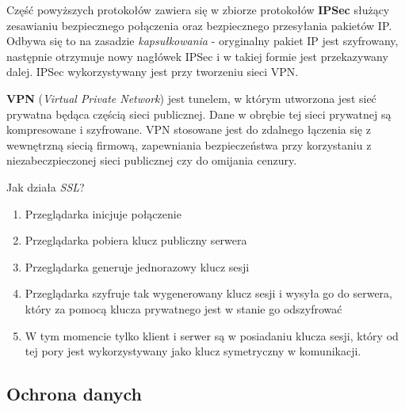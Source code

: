 Część powyższych protokołów zawiera się w zbiorze protokołów \textbf{IPSec} służący zesawianiu bezpiecznego połączenia oraz bezpiecznego przesyłania pakietów IP. Odbywa się to na zasadzie \textit{kapsułkowania} - oryginalny pakiet IP jest szyfrowany, następnie otrzymuje nowy nagłówek IPSec i w takiej formie jest przekazywany dalej. IPSec wykorzystywany jest przy tworzeniu sieci VPN.

\textbf{VPN} (\textit{Virtual Private Network}) jest tunelem, w którym utworzona jest sieć prywatna będąca częścią sieci publicznej. Dane w obrębie tej sieci prywatnej są kompresowane i szyfrowane. VPN stosowane jest do zdalnego łączenia się z wewnętrzną siecią firmową, zapewniania bezpieczeństwa przy korzystaniu z niezabeczpieczonej sieci publicznej czy do omijania cenzury.

Jak działa \textit{SSL}?
\begin{enumerate}
	\item Przeglądarka inicjuje połączenie
	\item Przeglądarka pobiera klucz publiczny serwera
	\item Przeglądarka generuje jednorazowy klucz sesji
	\item Przeglądarka szyfruje tak wygenerowany klucz sesji i wysyła go do serwera, który za pomocą klucza prywatnego jest w stanie go odszyfrować
	\item W tym momencie tylko klient i serwer są w posiadaniu klucza sesji, który od tej pory jest wykorzystywany jako klucz symetryczny w komunikacji.
\end{enumerate}

\subsection{Ochrona danych}

